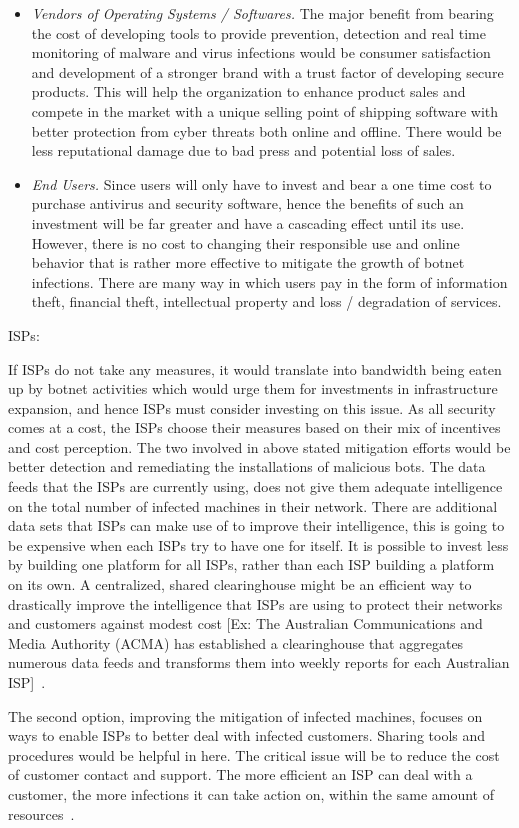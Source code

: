 \begin{itemize}
\item \textit{Vendors of Operating Systems / Softwares.} The major benefit from bearing the cost of developing tools to provide prevention, detection and real time monitoring of malware and virus infections would be consumer satisfaction and development of a stronger brand with a trust factor of developing secure products. This will help the organization to enhance product sales and compete in the market with a unique selling point of shipping software with better protection from cyber threats both online and offline. There would be less reputational damage due to bad press and potential loss of sales.
\item \textit{End Users.} Since users will only have to invest and bear a one time cost to purchase antivirus and security software, hence the benefits of such an investment will be far greater and have a cascading effect until its use. However, there is no cost to changing their responsible use and online behavior that is rather more effective to mitigate the growth of botnet infections. There are many way in which users pay in the form of information theft, financial theft, intellectual property and loss / degradation of services.
\end{itemize}


 ISPs:
 
 If ISPs do not take any measures, it would translate into bandwidth being eaten up by botnet activities which would urge them for investments in infrastructure expansion, and hence ISPs must consider investing on this issue. As all security comes at a cost, the ISPs choose their measures based on their mix of incentives and cost perception. The two involved in above stated mitigation efforts would be better detection and remediating the installations of malicious bots. The data feeds that the ISPs are currently using, does not give them adequate intelligence on the total number of infected machines in their network. There are additional data sets that ISPs can make use of to improve their intelligence, this is going to be expensive when each ISPs try to have one for itself. It is possible to invest less by building one platform for all ISPs, rather than each ISP building a platform on its own. A centralized, shared clearinghouse might be an efficient way to drastically improve the intelligence that ISPs are using to protect their networks and customers against modest cost [Ex: The Australian Communications and Media Authority (ACMA) has established a clearinghouse that aggregates numerous data feeds and transforms them into weekly reports for each Australian ISP]~\cite{asghari2010botnet}.
 
 The second option, improving the mitigation of infected machines, focuses on ways to enable ISPs to better deal with infected customers. Sharing tools and procedures would be helpful in here. The critical issue will be to reduce the cost of customer contact and support. The more efficient an ISP can deal with a customer, the more infections it can take action on, within the same amount of resources~\cite{asghari2010botnet}.
 
